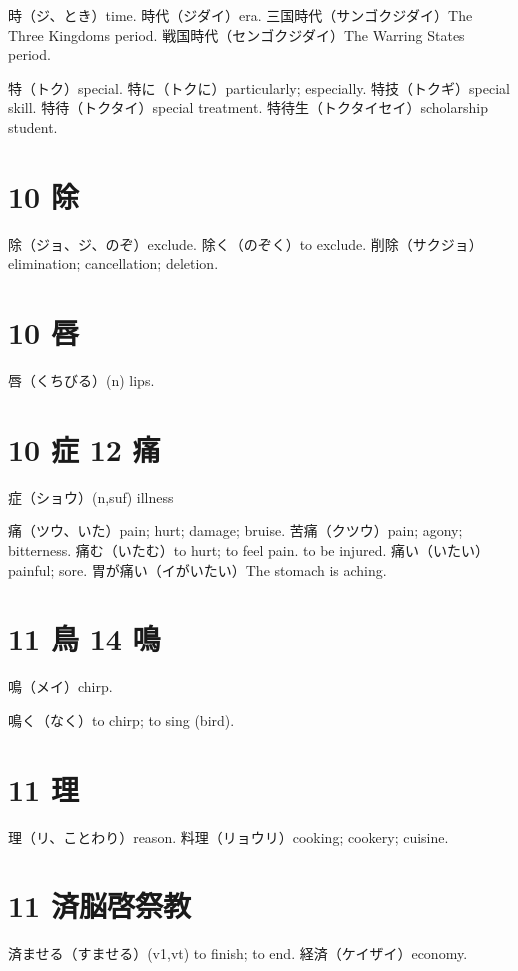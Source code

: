時（ジ、とき）time.
時代（ジダイ）era.
三国時代（サンゴクジダイ）The Three Kingdoms period.
戦国時代（センゴクジダイ）The Warring States period.

特（トク）special.
特に（トクに）particularly; especially.
特技（トクギ）special skill.
特待（トクタイ）special treatment.
特待生（トクタイセイ）scholarship student.

\section{10 除}

除（ジョ、ジ、のぞ）exclude.
除く（のぞく）to exclude.
削除（サクジョ）elimination; cancellation; deletion.

\section{10 唇}

唇（くちびる）(n) lips.

\section{10 症 12 痛}

症（ショウ）(n,suf) illness

痛（ツウ、いた）pain; hurt; damage; bruise.
苦痛（クツウ）pain; agony; bitterness.
痛む（いたむ）to hurt; to feel pain. to be injured.
痛い（いたい）painful; sore.
胃が痛い（イがいたい）The stomach is aching.

\section{11 鳥 14 鳴}

鳴（メイ）chirp.

鳴く（なく）to chirp; to sing (bird).

\section{11 理}

理（リ、ことわり）reason.
料理（リョウリ）cooking; cookery; cuisine.

\section{11 済脳啓祭教}

済ませる（すませる）(v1,vt) to finish; to end.
経済（ケイザイ）economy.

